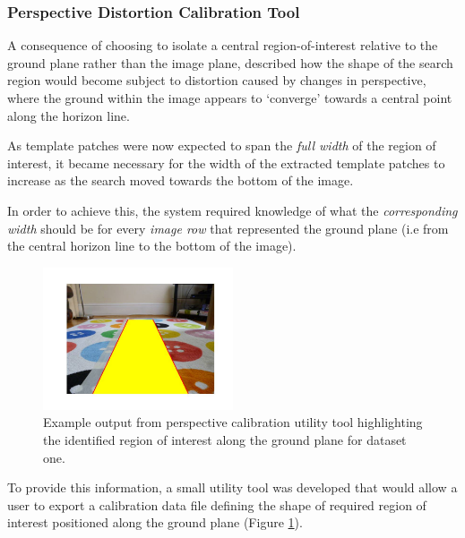\subsubsection{Perspective Distortion Calibration Tool}

A consequence of choosing to isolate a central region-of-interest relative to the ground plane rather than the image plane, described how the shape of the search region would become subject to distortion caused by changes in perspective, where the ground within the image appears to `converge' towards a central point along the horizon line.

As template patches were now expected to span the \textit{full width} of the region of interest, it became necessary for the width of the extracted template patches to increase as the search moved towards the bottom of the image. 

In order to achieve this, the system required knowledge of what the \textit{corresponding width} should be for every \textit{image row} that represented the ground plane (i.e from the central horizon line to the bottom of the image). 

\begin{figure}
\vspace{-20pt}
  \begin{center}
    \includegraphics[width=0.5\textwidth]{images/calib.jpg}
  \end{center}
  \vspace{-10pt}
  \caption{Example output from perspective calibration utility tool highlighting the identified region of interest along the ground plane for dataset one.}
     \label{fig:calib}
  \vspace{-10pt}
\end{figure}

To provide this information, a small utility tool was developed that would allow a user to export a calibration data file defining the shape of required region of interest positioned along the ground plane (Figure \ref{fig:calib}). 

